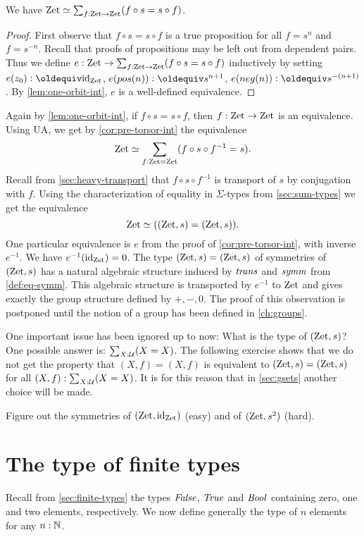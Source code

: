 \begin{corollary}\label{cor:pre-torsor-int}
We have $\mathrm{Zet}\simeq \sum_{f:\mathrm{Zet}\to\mathrm{Zet}} (f\circ s = s\circ f)$.
\end{corollary}
\begin{proof}
First observe that $f\circ s = s\circ f$ is a true proposition
for all $f=s^n$ and $f=s^{-n}$. Recall that proofs of propositions
may be left out from dependent pairs. Thus we
define $e : \mathrm{Zet}\to \sum_{f:\mathrm{Zet}\to\mathrm{Zet}} (f\circ s = s\circ f)$ 
inductively by setting 
$e(z_0)\defeq \id_\zet$, 
$e(pos(n))\defeq s^{n+1}$,
$e(neg(n))\defeq s^{-(n+1)}$.
By \cref{lem:one-orbit-int}, $e$ is a well-defined equivalence.
\end{proof}

Again by \cref{lem:one-orbit-int}, if $f\circ s = s\circ f$,
then $f: \mathrm{Zet}\to\mathrm{Zet}$ is an equivalence. 
Using UA, we get by \cref{cor:pre-torsor-int} the equivalence
\[
\mathrm{Zet}\simeq \sum_{f:\mathrm{Zet}=\mathrm{Zet}} (f\circ s \circ f^{-1} = s).
\]
Recall from \cref{sec:heavy-transport} 
that $f\circ s \circ f^{-1}$ is transport of $s$ by
conjugation with $f$. Using the characterization of equality 
in $\Sigma$-types from \cref{sec:sum-types} we get the equivalence
\[
\mathrm{Zet}\simeq ((\mathrm{Zet},s) = (\mathrm{Zet},s)).
\]
One particular equivalence is $e$ from the proof
of \cref{cor:pre-torsor-int}, with inverse $e^{-1}$.
We have $e^{-1}(\mathord{\mathrm{id}}_{\mathrm{Zet}}) = 0$.
The type $(\mathrm{Zet},s) = (\mathrm{Zet},s)$ of symmetries of $(\mathrm{Zet},s)$
has a natural algebraic structure induced by
$\mathop{\mathit{trans}}$ and $\mathop{\mathit{symm}}$ from \cref{def:eq-symm}.
This algebraic structure is transported by $e^{-1}$ to $\mathrm{Zet}$
and gives exactly the group structure defined by ${+},{-},0$.
The proof of this observation is postponed until the notion
of a group has been defined in \cref{ch:groups}.

One important issue has been ignored up to now:
What is the type of $(\mathrm{Zet},s)$? 
One possible answer is: $\sum_{X:\mathcal{U}}(X=X)$.
The following exercise shows that we do not get the 
property that $(X,f)=(X,f)$ is equivalent to
$(\mathrm{Zet},s) = (\mathrm{Zet},s)$ for all $(X,f) : \sum_{X:\mathcal{U}}(X=X)$.
It is for this reason that in \cref{sec:gsets} 
another choice will be made.

\begin{xca}\label{xca:zet-symmetries}
Figure out the symmetries of $(\mathrm{Zet},\mathord{\mathrm{id}}_{\mathrm{Zet}})$ (easy) and 
of $(\mathrm{Zet},s^2)$ (hard).
\end{xca}

\section{The type of finite types}
\label{sec:typeFin}
Recall from \cref{sec:finite-types} the types
$\mathop{\mathit{False}}$, $\mathop{\mathit{True}}$ and $\mathop{\mathit{Bool}}$ containing zero, one and two
elements, respectively. We now define generally the
type of $n$ elements for any $n:\mathbb{N}$.

